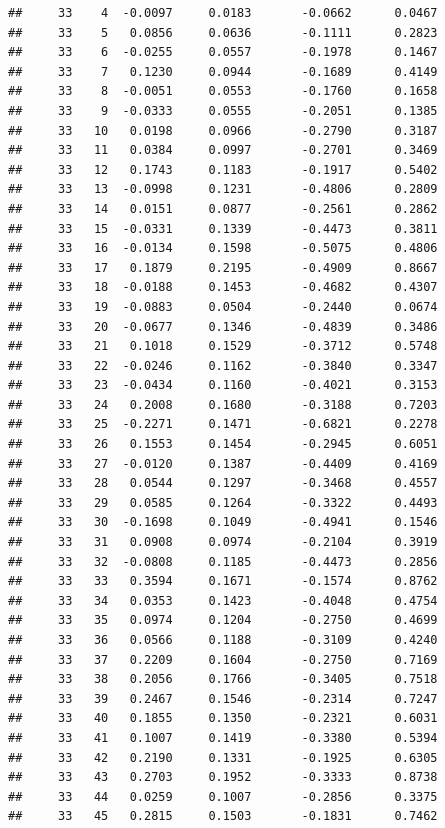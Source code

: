 \documentclass[
]{article}
\begin{document}
\begin{verbatim}
##     33    4  -0.0097     0.0183       -0.0662      0.0467  
##     33    5   0.0856     0.0636       -0.1111      0.2823  
##     33    6  -0.0255     0.0557       -0.1978      0.1467  
##     33    7   0.1230     0.0944       -0.1689      0.4149  
##     33    8  -0.0051     0.0553       -0.1760      0.1658  
##     33    9  -0.0333     0.0555       -0.2051      0.1385  
##     33   10   0.0198     0.0966       -0.2790      0.3187  
##     33   11   0.0384     0.0997       -0.2701      0.3469  
##     33   12   0.1743     0.1183       -0.1917      0.5402  
##     33   13  -0.0998     0.1231       -0.4806      0.2809  
##     33   14   0.0151     0.0877       -0.2561      0.2862  
##     33   15  -0.0331     0.1339       -0.4473      0.3811  
##     33   16  -0.0134     0.1598       -0.5075      0.4806  
##     33   17   0.1879     0.2195       -0.4909      0.8667  
##     33   18  -0.0188     0.1453       -0.4682      0.4307  
##     33   19  -0.0883     0.0504       -0.2440      0.0674  
##     33   20  -0.0677     0.1346       -0.4839      0.3486  
##     33   21   0.1018     0.1529       -0.3712      0.5748  
##     33   22  -0.0246     0.1162       -0.3840      0.3347  
##     33   23  -0.0434     0.1160       -0.4021      0.3153  
##     33   24   0.2008     0.1680       -0.3188      0.7203  
##     33   25  -0.2271     0.1471       -0.6821      0.2278  
##     33   26   0.1553     0.1454       -0.2945      0.6051  
##     33   27  -0.0120     0.1387       -0.4409      0.4169  
##     33   28   0.0544     0.1297       -0.3468      0.4557  
##     33   29   0.0585     0.1264       -0.3322      0.4493  
##     33   30  -0.1698     0.1049       -0.4941      0.1546  
##     33   31   0.0908     0.0974       -0.2104      0.3919  
##     33   32  -0.0808     0.1185       -0.4473      0.2856  
##     33   33   0.3594     0.1671       -0.1574      0.8762  
##     33   34   0.0353     0.1423       -0.4048      0.4754  
##     33   35   0.0974     0.1204       -0.2750      0.4699  
##     33   36   0.0566     0.1188       -0.3109      0.4240  
##     33   37   0.2209     0.1604       -0.2750      0.7169  
##     33   38   0.2056     0.1766       -0.3405      0.7518  
##     33   39   0.2467     0.1546       -0.2314      0.7247  
##     33   40   0.1855     0.1350       -0.2321      0.6031  
##     33   41   0.1007     0.1419       -0.3380      0.5394  
##     33   42   0.2190     0.1331       -0.1925      0.6305  
##     33   43   0.2703     0.1952       -0.3333      0.8738  
##     33   44   0.0259     0.1007       -0.2856      0.3375  
##     33   45   0.2815     0.1503       -0.1831      0.7462  

\end{verbatim}
\end{document}
